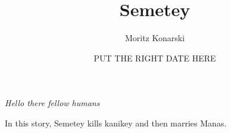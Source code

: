 \documentclass[12pt,a4paper]{article}
\newcommand{\Se}{Semetey}               %
\newcommand{\Ka}{kanikey}               %
\newcommand{\Ma}{Manas}                 %
\begin{document}
\title{Semetey}
\author{Moritz Konarski}
\date{PUT THE RIGHT DATE HERE}
\maketitle

\emph{Hello there fellow humans}

In this story, \Se{} kills \Ka{} and then marries \Ma{}.
\end{document}
